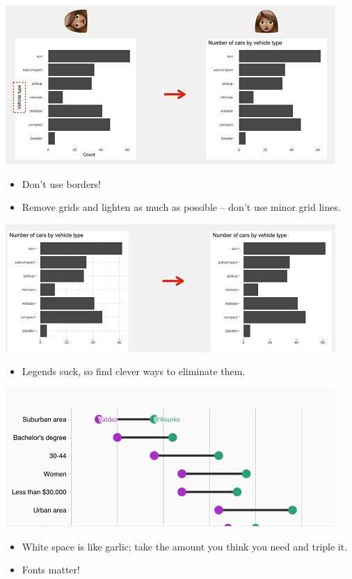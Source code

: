 \documentclass[
]{article}
\providecommand{\tightlist}{%
  \setlength{\itemsep}{0pt}\setlength{\parskip}{0pt}}
\begin{document}
\includegraphics{images/tilt.JPG}

\begin{itemize}
\item
  Don't use borders!
\item
  Remove grids and lighten as much as possible -- don't use minor grid
  lines.
\end{itemize}

\includegraphics{images/grids.JPG}

\begin{itemize}
\tightlist
\item
  Legends suck, so find clever ways to eliminate them.
\end{itemize}

\includegraphics{images/legend.JPG}

\begin{itemize}
\item
  White space is like garlic; take the amount you think you need and
  triple it.
\item
  Fonts matter!
\end{itemize}
\end{document}
